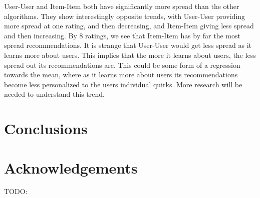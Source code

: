 \documentclass[letterpaper]{sig-alternate}
\begin{document}
  User-User and Item-Item both have significantly more spread than the other algorithms.
  They show interestingly opposite trends, with User-User providing more spread at one rating, and then decreasing, and Item-Item giving less spread and then increasing.
  By 8 ratings, we see that Item-Item has by far the most spread recommendations.
  It is strange that User-User would get less spread as it learns more about users.
  This implies that the more it learns about users, the less spread out its recommendations are.
  This could be some form of a regression towards the mean, where as it learns more about users its recommendations become less personalized to the users individual quirks.
  More research will be needed to understand this trend.
  
\section{Conclusions}



\section{Acknowledgements}
 TODO:


\end{document}
